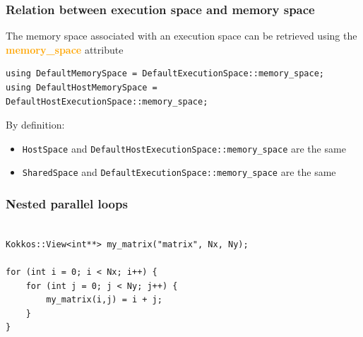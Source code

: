 \documentclass[aspectratio=169]{beamer}
\newcommand{\highlight}[1]{\textcolor{orange}{\textbf{#1}}}
\begin{document}
\begin{frame}[fragile]
    \frametitle{Relation between execution space and memory space}


The memory space associated with an execution space can be retrieved using the \highlight{memory\_space} attribute

\footnotesize
\begin{verbatim}
using DefaultMemorySpace = DefaultExecutionSpace::memory_space;
using DefaultHostMemorySpace = DefaultHostExecutionSpace::memory_space;
\end{verbatim}

\normalsize
By definition:
\begin{itemize}
    \item \texttt{HostSpace} and \texttt{DefaultHostExecutionSpace::memory\_space} are the same
    \item \texttt{SharedSpace} and \texttt{DefaultExecutionSpace::memory\_space} are the same
\end{itemize}

\end{frame}


\begin{frame}[fragile]
    \frametitle{Nested parallel loops}

\begin{verbatim}

Kokkos::View<int**> my_matrix("matrix", Nx, Ny);

for (int i = 0; i < Nx; i++) {
    for (int j = 0; j < Ny; j++) {
        my_matrix(i,j) = i + j;
    }
}
\end{verbatim}

\end{frame}

\end{document}
